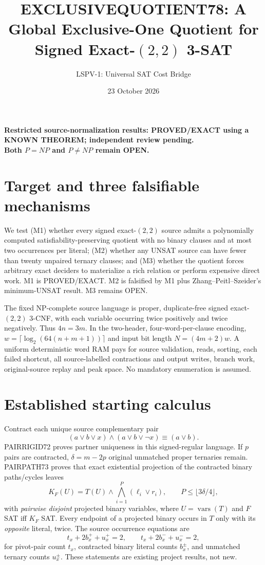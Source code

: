 \documentclass[11pt]{article}
\title{EXCLUSIVEQUOTIENT78: A Global Exclusive-One Quotient for Signed Exact-$(2,2)$ 3-SAT}
\author{LSPV-1: Universal SAT Cost Bridge}
\date{23 October 2026}
\begin{document}
\maketitle
\begin{center}\textbf{Restricted source-normalization results: PROVED/EXACT using a KNOWN THEOREM; independent review pending.}\\ \textbf{Both $P=NP$ and $P\ne NP$ remain OPEN.}\end{center}
\section{Target and three falsifiable mechanisms}
We test (M1) whether every signed exact-$(2,2)$ source admits a polynomially computed satisfiability-preserving quotient with no binary clauses and at most two occurrences per literal; (M2) whether any UNSAT source can have fewer than twenty unpaired ternary clauses; and (M3) whether the quotient forces arbitrary exact deciders to materialize a rich relation or perform expensive direct work. M1 is PROVED/EXACT. M2 is falsified by M1 plus Zhang--Peitl--Szeider's minimum-UNSAT result. M3 remains OPEN.

The fixed NP-complete source language is proper, duplicate-free signed exact-$(2,2)$ 3-CNF, with each variable occurring twice positively and twice negatively. Thus $4n=3m$. In the two-header, four-word-per-clause encoding, $w=\lceil\log_2(64(n+m+1))\rceil$ and input bit length $N=(4m+2)w$. A uniform deterministic word RAM pays for source validation, reads, sorting, each failed shortcut, all source-labelled contractions and output writes, branch work, original-source replay and peak space. No mandatory enumeration is assumed.
\section{Established starting calculus}
Contract each unique source complementary pair
\[
(a\vee b\vee x)\wedge(a\vee b\vee\neg x)\equiv(a\vee b).
\]
PAIRRIGID72 proves partner uniqueness in this signed-regular language. If $p$ pairs are contracted, $\delta=m-2p$ original unmatched proper ternaries remain. PAIRPATH73 proves that exact existential projection of the contracted binary paths/cycles leaves
\[
K_F(U)=T(U)\wedge\bigwedge_{i=1}^{P}(\ell_i\vee r_i),\qquad
P\le\lfloor3\delta/4\rfloor,
\]
with \emph{pairwise disjoint} projected binary variables, where $U=\operatorname{vars}(T)$ and $F$ SAT iff $K_F$ SAT. Every endpoint of a projected binary occurs in $T$ only with its \emph{opposite} literal, twice. The source occurrence equations are
\[
t_x+2b_x^++u_x^+=2,\qquad t_x+2b_x^-+u_x^-=2,
\]
for pivot-pair count $t_x$, contracted binary literal counts $b_x^\pm$, and unmatched ternary counts $u_x^\pm$. These statements are existing project results, not new.
\end{document}
